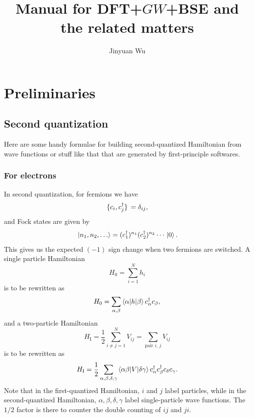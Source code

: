 \documentclass[hyperref, a4paper, 12pt]{report}
\title{Manual for DFT+$GW$+BSE and the related matters}
\author{Jinyuan Wu}
\begin{document}
    
\maketitle

\tableofcontents


\chapter{Preliminaries}

\section{Second quantization}

Here are some handy formulae for building second-quantized Hamiltonian 
from wave functions or stuff like that 
that are generated by first-principle softwares.

\subsection{For electrons}

In second quantization, for fermions we have 
\begin{equation}
    \acomm*{c_i}{c_j^\dagger} = \delta_{ij},
\end{equation}
and Fock states are given by
\begin{equation}
    \ket*{n_1, n_2, \ldots} = (c_1^\dagger)^{n_1} (c_2^\dagger)^{n_2} \cdots \ket*{0}.
\end{equation}
This gives us the expected $(-1)$ sign change 
when two fermions are switched. 
A single particle Hamiltonian 
\begin{equation}
    H_0 = \sum_{i=1}^{N} h_i
\end{equation}
is to be rewritten as 
\begin{equation}
    H_0 = \sum_{\alpha, \beta} \mel**{\alpha}{h}{\beta} c_\alpha^\dagger c_\beta,
\end{equation}
and a two-particle Hamiltonian 
\begin{equation}
    H_\text{I} = \frac{1}{2} \sum_{i \neq j = 1}^{N} V_{ij}
    = \sum_{\text{pair $i$, $j$}} V_{ij}
\end{equation}
is to be rewritten as 
\begin{equation}
    H_{\text{I}} = \frac{1}{2} \sum_{\alpha, \beta, \delta, \gamma}
        \mel**{\alpha \beta}{V}{\delta \gamma} 
        c^\dagger_\alpha c^\dagger_\beta c_\delta c_\gamma.
\end{equation}
Note that in the first-quantized Hamiltonian, 
$i$ and $j$ label particles, 
while in the second-quantized Hamiltonian, 
$\alpha, \beta, \delta, \gamma$ label single-particle wave functions.
The $1/2$ factor is there to counter the double counting of $ij$ and $ji$.
\end{document}
